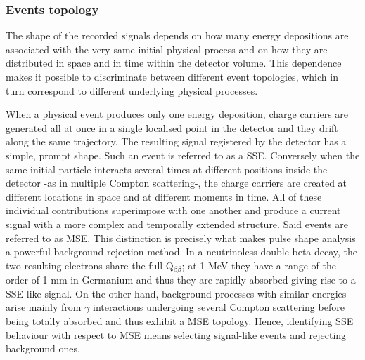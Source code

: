 \newpage
\subsubsection{Events topology}
\label{subsubsec:topology}
The shape of the recorded signals depends on how many energy depositions are associated with the very same initial physical process and on how they are distributed in space and in time within the detector volume. This dependence makes it possible to discriminate between different event topologies, which in turn correspond to different underlying physical processes.

When a physical event produces only one energy deposition, charge carriers are generated all at once in a single localised point in the detector and they drift along the same trajectory. The resulting signal registered by the detector has a simple, prompt shape. Such an event is referred to as a \ac{SSE}.
Conversely when the same initial particle interacts several times at different positions inside the detector -as in multiple Compton scattering-, the charge carriers are created at different locations in space and at different moments in time. All of these individual contributions superimpose with one another and produce a current signal with a more complex and temporally extended structure. Said events are referred to as \ac{MSE}.
This distinction is precisely what makes pulse shape analysis a powerful background rejection method. In a neutrinoless double beta decay, the two resulting electrons share the full Q$_{\beta\beta}$; at 1 MeV they have a range of the order of 1 mm in Germanium and thus they are rapidly absorbed giving rise to a \ac{SSE}-like signal. 
On the other hand, background processes with similar energies arise mainly from $\gamma$ interactions undergoing several Compton scattering before being totally absorbed and thus exhibit a \ac{MSE} topology. Hence, identifying \ac{SSE} behaviour with respect to \ac{MSE} means selecting signal-like events and rejecting background ones.

